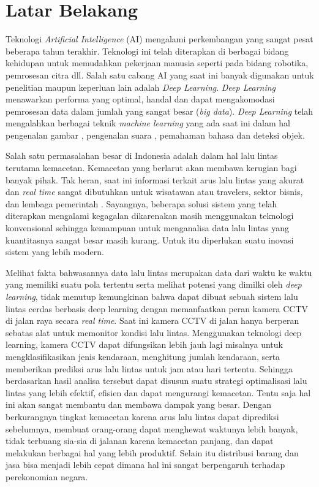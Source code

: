 \documentclass[../thesis.tex]{subfiles}
\begin{document}
\section{Latar Belakang}
Teknologi \textit{Artificial Intelligence} (AI) mengalami perkembangan yang sangat pesat beberapa tahun terakhir. Teknologi ini telah diterapkan di berbagai bidang kehidupan untuk memudahkan pekerjaan manusia seperti pada bidang robotika, pemrosesan citra dll. 
Salah satu cabang AI yang saat ini banyak digunakan untuk penelitian maupun keperluan lain adalah \textit{Deep Learning}. \textit{Deep Learning} menawarkan performa yang optimal, handal dan dapat mengakomodasi pemrosesan data dalam jumlah yang sangat besar (\textit{big data}). 
\textit{Deep Learning} telah mengalahkan berbagai teknik \textit{machine learning} yang ada saat ini dalam hal pengenalan gambar \cite{Krizhevsky2002ImageNet}, pengenalan suara \cite{Hinton2012Speech}, pemahaman bahasa \cite{Collobert2011NLP} dan deteksi objek.

Salah satu permasalahan besar di Indonesia adalah dalam hal lalu lintas terutama kemacetan. Kemacetan yang berlarut akan membawa kerugian bagi banyak pihak. Tak heran, saat ini informasi terkait arus lalu lintas yang akurat dan \textit{real time} sangat dibutuhkan untuk wisatawan atau travelers, sektor bisnis, dan lembaga pemerintah \cite{Zhang2008DynaCAS}. Sayangnya, beberapa solusi sistem yang telah diterapkan mengalami kegagalan dikarenakan masih menggunakan teknologi konvensional sehingga kemampuan untuk menganalisa data lalu lintas yang kuantitasnya sangat besar masih kurang. 
Untuk itu diperlukan suatu inovasi sistem yang lebih modern.

Melihat fakta bahwasannya data lalu lintas merupakan data dari waktu ke waktu yang memiliki suatu pola tertentu serta melihat potensi yang dimilki oleh \textit{deep learning}, tidak menutup kemungkinan bahwa dapat dibuat sebuah sistem lalu lintas cerdas berbasis deep learning dengan memanfaatkan peran kamera CCTV di jalan raya secara \textit{real time}. Saat ini kamera CCTV di jalan hanya berperan sebatas alat untuk memonitor kondisi lalu lintas. 
Menggunakan teknologi deep learning, kamera CCTV dapat difungsikan lebih jauh lagi misalnya untuk mengklasifikasikan jenis kendaraan, menghitung jumlah kendaraan, serta memberikan prediksi arus lalu lintas untuk jam atau hari tertentu. Sehingga berdasarkan hasil analisa tersebut dapat disusun suatu strategi optimalisasi lalu lintas yang lebih efektif, efisien dan dapat mengurangi kemacetan. 
Tentu saja hal ini akan sangat membantu dan membawa dampak yang besar. Dengan berkurangnya tingkat kemacetan karena arus lalu lintas dapat diprediksi sebelumnya, membuat orang-orang dapat menghewat waktunya lebih banyak, tidak terbuang sia-sia di jalanan karena kemacetan panjang, dan dapat melakukan berbagai hal yang lebih produktif. 
Selain itu distribusi barang dan jasa bisa menjadi lebih cepat dimana hal ini sangat berpengaruh terhadap perekonomian negara. 
\end{document}
